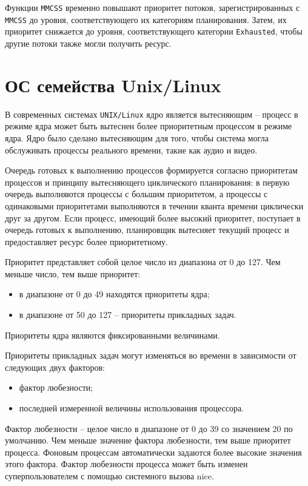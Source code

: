 Функции \texttt{MMCSS} временно повышают приоритет потоков, зарегистрированных
с \texttt{MMCSS} до уровня, соответствующего их категориям планирования.
Затем, их приоритет снижается до уровня, соответствующего категории
\texttt{Exhausted}, чтобы другие потоки также могли получить ресурс.


\section{ОС семейства Unix/Linux}

В современных системах \texttt{UNIX/Linux} ядро является вытесняющим – процесс
в режиме ядра может быть вытеснен более приоритетным процессом в режиме ядра.
Ядро было сделано вытесняющим для того, чтобы система могла обслуживать
процессы реального времени, такие как аудио и видео.

Очередь готовых к выполнению процессов формируется согласно приоритетам
процессов и принципу вытесняющего циклического планирования: в первую очередь
выполняются процессы с большим приоритетом, а процессы с одинаковыми
приоритетами выполняются в течении кванта времени циклически друг за другом.
Если процесс, имеющий более высокий приоритет, поступает в очередь готовых к
выполнению, планировщик вытесняет текущий процесс и предоставляет ресурс более
приоритетному.

Приоритет представляет собой целое число из диапазона от 0 до 127. Чем меньше
число, тем выше приоритет:
\begin{itemize}
    \item в диапазоне от 0 до 49 находятся приоритеты ядра;
    \item в диапазоне от 50 до 127 – приоритеты прикладных задач.
\end{itemize}

Приоритеты ядра являются фиксированными величинами.

Приоритеты прикладных задач могут изменяться во времени в зависимости от
следующих двух факторов:
\begin{itemize}
    \item фактор любезности;
    \item последней измеренной величины использования процессора.
\end{itemize}

Фактор любезности – целое число в диапазоне от 0 до 39 со значением 20 по
умолчанию. Чем меньше значение фактора любезности, тем выше приоритет процесса.
Фоновым процессам автоматически задаются более высокие значения этого фактора.
Фактор любезности процесса может быть изменен суперпользователем с помощью
системного вызова nice.

